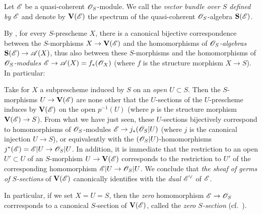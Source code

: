 \begin{definition}[1.7.8]
\label{II.1.7.8}
Let $\mathscr{E}$ be a quasi-coherent $\mathscr{O}_S$-module.
We call the \emph{vector bundle over $S$ defined by $\mathscr{E}$} and denote by $\mathbf{V}(\mathscr{E})$ the spectrum  of the quasi-coherent $\mathscr{O}_S$-algebra $\mathbf{S}(\mathscr{E})$.
\end{definition}

By , for every $S$-prescheme $X$, there is a canonical bijective correspondence between the $S$-morphisms $X\to\bb{V}(\sh{E})$ and the homomorphisms of \emph{$\mathscr{O}_S$-algebras $\bb{S}(\sh{E})\to\sh{A}(X)$}, thus also between these $S$-morphisms and the homomorphisms of \emph{$\mathscr{O}_S$-modules $\sh{E}\to\sh{A}(X)=f_*(\sh{O}_X)$} (where $f$ is the structure morphism $X\to S$).
In particular:
\begin{env}[1.7.9]
\label{II.1.7.9}
Take for $X$ a subprescheme induced by $S$ on an \emph{open $U\subset S$}.
Then the $S$-morphisms $U\to\bb{V}(\sh{E})$ are none other that the $U$-sections  of the $U$-prescheme induces by $\mathbf{V}(\mathscr{E})$ on the open $p^{-1}(U)$ (where $p$ is the structure morphism $\bb{V}(\sh{E})\to S$).
From what we have just seen, these $U$-sections bijectively correspond to homomorphisms of $\mathscr{O}_S$-modules $\sh{E}\to j_*(\sh{O}_S|U)$ (where $j$ is the canonical injection $U\to S$), or
equivalently  with the $(\mathscr{O}_S|U)$-homomorphisms $j^*(\sh{E})=\sh{E}|U\to\sh{O}_S|U$.
In addition, it is immediate that the restriction to an open $U'\subset U$ of an $S$-morphism $U\to\bb{V}(\sh{E})$ corresponds to the restriction to $U'$ of the corresponding homomorphism $\sh{E}|U\to\sh{O}_S|U$.
We conclude that \emph{the sheaf of germs of $S$-sections} of $\mathbf{V}(\mathscr{E})$ canonically identifies with the \emph{dual ${\mathscr{E}}^\vee$} of $\mathscr{E}$.

In particular, if we set $X=U=S$, then the \emph{zero} homomorphism $\sh{E}\to\sh{O}_S$ corrresponds to a canonical $S$-section of $\mathbf{V}(\mathscr{E})$, called the \emph{zero $S$-section} (cf.~).
\end{env}

